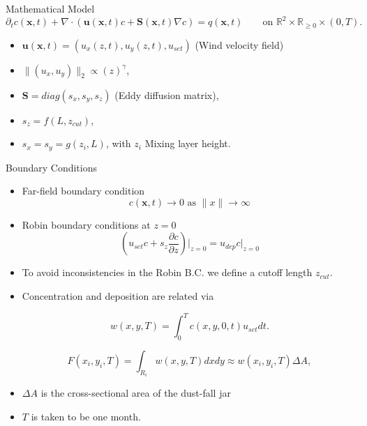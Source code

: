 \documentclass[11pt]{beamer}
\theoremstyle{plain}
\theoremstyle{definition}
\begin{document}
\begin{frame}{Mathematical Model}
\begin{equation*}
\partial_{t} c(\textbf{x},t)+\nabla\cdot(\textbf{u}(\textbf{x},t)c+\textbf{S}(\textbf{x},t)\nabla c)
=q(\textbf{x},t)\qquad\text{on }\mathbb{R}^{2}\times\mathbb{R}_{\geq 0}\times(0,T).
\end{equation*}
\begin{itemize}
\item $\textbf{u}(\textbf{x},t)=(u_{x}(z,t),u_{y}(z,t),u_{set})$ 
(Wind velocity field)
\item $\|(u_{x},u_{y})\|_{2}\propto\left(z\right)^{\gamma}$,
\item $\textbf{S}=diag(s_{x},s_{y},s_{z})$ (Eddy diffusion matrix),
\item $s_{z}=f(L,z_{cut})$,
\item $s_{x}=s_{y}=g(z_{i},L)$, with $z_{i}$ Mixing layer height.
\end{itemize}
\end{frame}



\begin{frame}{Boundary Conditions}

\begin{itemize}
\item Far-field boundary condition
\begin{equation*}
c(\textbf{x},t)\rightarrow 0\text{ as }\|x\|\rightarrow \infty
\end{equation*}

\item Robin boundary conditions at $z=0$
\begin{equation*}
\left(u_{set}c+s_{z}\frac{\partial c}{\partial z}\right)\Big|_{z=0}=u_{dep}c\Big|_{z=0}
\end{equation*}

\item To avoid inconsistencies in the Robin B.C. we define a cutoff length $z_{cut}$.


\end{itemize}
\end{frame}


\begin{frame}


\begin{itemize}
\item Concentration and deposition are related via

\begin{equation}\label{eqnw}
w(x,y,T)=\int_{0}^{T}c(x,y,0,t)u_{set}dt.
\end{equation}

\begin{equation*}
F(x_{i},y_{i},T)=\int_{R_{i}}w(x,y,T)dxdy\approx w(x_{i},y_{i},T)\Delta A,
\end{equation*}
\item $\Delta A$ is the cross-sectional area of the dust-fall jar
\item $T$ is taken to be one month.
\end{itemize}

\end{frame}
\end{document}
